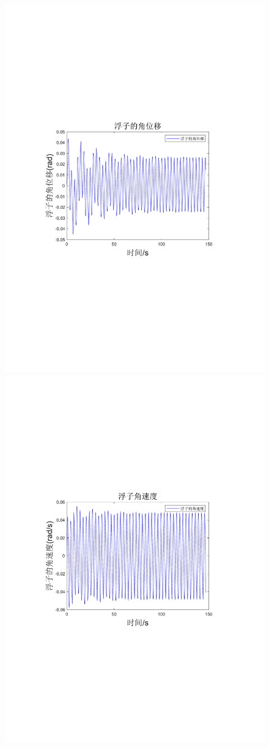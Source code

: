 \documentclass[12pt,utf8]{article}
\begin{document}
\begin{figure}[htbp]
\begin{minipage}{0.45\linewidth}
		\includegraphics[width=0.9\linewidth]{figures/浮子的角位移.pdf}
	\end{minipage}
	\begin{minipage}{0.45\linewidth}
		\includegraphics[width=0.9\linewidth]{figures/浮子角速度.pdf}

\end{minipage}
\end{figure}
\end{document}
